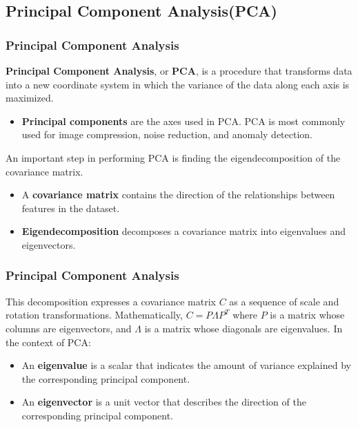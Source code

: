 \documentclass[8pt,dvipsnames]{beamer}
\begin{document}
\subsection{Principal Component Analysis(PCA)}
\begin{frame}
    \frametitle{Principal Component Analysis}
    \textbf{Principal Component Analysis}, or \textbf{PCA}, is a procedure that transforms data into a new coordinate system in which the variance of the data along each axis is maximized.
    \begin{itemize}
        \item \textbf{Principal components} are the axes used in PCA. PCA is most commonly used for image compression, noise reduction, and anomaly detection.
    \end{itemize}
    An important step in performing PCA is finding the eigendecomposition of the covariance matrix.
    \begin{itemize}
        \item  A \textbf{covariance matrix} contains the direction of the relationships between features in the dataset.
        \item \textbf{Eigendecomposition} decomposes a covariance matrix into eigenvalues and eigenvectors.
    \end{itemize}
\end{frame}

\begin{frame}
    \frametitle{Principal Component Analysis}
    This decomposition expresses a covariance matrix \(C\) as a sequence of scale and rotation transformations. Mathematically, \(C=P \Lambda P^{T}\) where \(P\) is a matrix whose columns are eigenvectors, and \(\Lambda\) is a matrix whose diagonals are eigenvalues. In the context of PCA:
    \begin{itemize}
        \item An \textbf{eigenvalue} is a scalar that indicates the amount of variance explained by the corresponding principal component.
        \item An \textbf{eigenvector} is a unit vector that describes the direction of the corresponding principal component.
    \end{itemize}
\end{frame}
\end{document}
